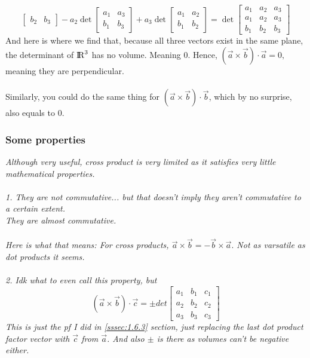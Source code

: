 \documentclass[addpoints]{exam}
\begin{document}
{\[\begin{bmatrix}
    b_2&b_3
\end{bmatrix} - 
a_2\det\begin{bmatrix}
    a_1&a_3\\
    b_1&b_3
\end{bmatrix}+
a_3\det\begin{bmatrix}
    a_1&a_2\\
    b_1&b_2
\end{bmatrix}=\det\begin{bmatrix}
    a_1&a_2&a_3\\
    a_1&a_2&a_3\\
    b_1&b_2&b_3
\end{bmatrix}
\]
And here is where we find that, because all three vectors exist in the same plane, the determinant of ${\rm I\!R}^3$ has no volume. Meaning 0. Hence, $(\vec{a}\times\vec{b})\cdot\vec{a}=0,$ meaning they are perpendicular.\\\\
Similarly, you could do the same thing for $(\vec{a}\times\vec{b})\cdot\vec{b}$, which by no surprise, also equals to 0.
}

\subsubsection{
Some properties
}
\textit{
Although very useful, cross product is very limited as it satisfies very little mathematical properties. \\\\
1. They are not commutative... but that doesn't imply they aren't commutative to a certain extent.\\
They are almost commutative.\\\\
Here is what that means: For cross products, $\vec{a}\times\vec{b} = -\vec{b}\times\vec{a}.$ Not as varsatile as dot products it seems.\\\\
2. Idk what to even call this property, but \[
(\vec{a}\times\vec{b})\cdot\vec{c} =
\pm det\begin{bmatrix}
    a_1&b_1&c_1\\a_2&b_2&c_2\\a_3&b_3&c_3
\end{bmatrix}
\]
This is just the pf I did in \ref{sssec:1.6.3} section, just replacing the last dot product factor vector with $\vec{c}$ from $\vec{a}$. And also $\pm$ is there as volumes can't be negative either.
}
\end{document}
